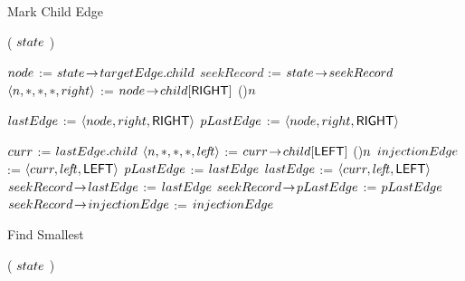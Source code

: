 \begin{limitscope}
\begin{algorithm}[!thb]
{{			
	 }

   \Return \True\;
}
\caption{Mark Child Edge}
\label{algo:markChildEdge}



\end{algorithm}


\begin{algorithm}[!thb]
\DefineKeyWords

\BlankLine

\DontPrintSemicolon
\Boolean \FindSmallest( $state$ )\;
\PrintSemicolon
\Begin
{
	 $node$ := $state \!\rightarrow\! targetEdge.child$\;
	 $seekRecord$ := $state \!\rightarrow\! seekRecord$\;
	 $\langle  n, \ast, \ast, \ast, right  \rangle$ := $node \!\rightarrow\! child[\textsf{RIGHT}]$\;
	 \If(){$n$}
	 {
			\Return \False\;
	 }
	
	 \BlankLine	
		
	 
	
	 $lastEdge$ := $\langle  node, right, \textsf{RIGHT}  \rangle$\;
	 $pLastEdge$ := $\langle  node, right, \textsf{RIGHT}  \rangle$\;
		 
	 	
	 \While{\True}
	 {
	    $curr$ := $lastEdge.child$\;
      $\langle  n, \ast, \ast, \ast, le\!f\!t  \rangle$ := $curr \!\rightarrow\! child[\textsf{LEFT}]$\;			
			\If(){$n$}	
			{
			   $injectionEdge$ := $\langle curr, le\!f\!t, \textsf{LEFT} \rangle$\;
			   \Break\;
			}				
			\BlankLine			
			$pLastEdge$ := $lastEdge$\;
	    $lastEdge$ := $\langle  curr, le\!f\!t, \textsf{LEFT}  \rangle$\;			
	 }	
	 \BlankLine
	 $seekRecord \!\rightarrow\! lastEdge$ := $lastEdge$\;
	 $seekRecord \!\rightarrow\! pLastEdge$ := $pLastEdge$\;
   $seekRecord \!\rightarrow\! injectionEdge$ := $injectionEdge$\;
	 \Return \True\;	
}
\caption{Find Smallest}
\label{algo:findSmallest}
\end{algorithm}


\begin{algorithm}[!thb]
\DefineKeyWords


\DontPrintSemicolon
\InitializeTypeAndUpdateMode( $state$ )\;
\PrintSemicolon
\Begin
{

}
\end{algorithm}
\end{limitscope}
